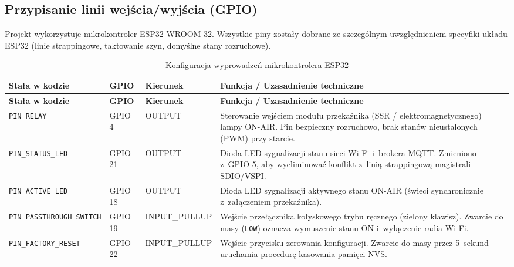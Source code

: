 \documentclass[11pt,a4paper]{article}
\begin{document}
\subsection{Przypisanie linii wejścia/wyjścia (GPIO)}
Projekt wykorzystuje mikrokontroler ESP32-WROOM-32. Wszystkie piny zostały dobrane ze szczególnym uwzględnieniem specyfiki układu ESP32 (linie strappingowe, taktowanie szyn, domyślne stany rozruchowe).

\begin{xltabular}{\textwidth}{l l l X}
\caption{Konfiguracja wyprowadzeń mikrokontrolera ESP32} \label{tab:pinout} \\
\toprule
\textbf{Stała w kodzie} & \textbf{GPIO} & \textbf{Kierunek} & \textbf{Funkcja / Uzasadnienie techniczne} \\
\midrule
\endfirsthead
\toprule
\textbf{Stała w kodzie} & \textbf{GPIO} & \textbf{Kierunek} & \textbf{Funkcja / Uzasadnienie techniczne} \\
\midrule
\endhead
\bottomrule
\endfoot
\texttt{PIN\_RELAY} & GPIO 4 & OUTPUT & Sterowanie wejściem modułu przekaźnika (SSR / elektromagnetycznego) lampy ON-AIR. Pin bezpieczny rozruchowo, brak stanów nieustalonych (PWM) przy starcie. \\
\addlinespace
\texttt{PIN\_STATUS\_LED} & GPIO 21 & OUTPUT & Dioda LED sygnalizacji stanu sieci Wi-Fi i~brokera MQTT. Zmieniono z~GPIO 5, aby wyeliminować konflikt z~linią strappingową magistrali SDIO/VSPI. \\
\addlinespace
\texttt{PIN\_ACTIVE\_LED} & GPIO 18 & OUTPUT & Dioda LED sygnalizacji aktywnego stanu ON-AIR (świeci synchronicznie z~załączeniem przekaźnika). \\
\addlinespace
\texttt{PIN\_PASSTHROUGH\_SWITCH} & GPIO 19 & INPUT\_PULLUP & Wejście przełącznika kołyskowego trybu ręcznego (zielony klawisz). Zwarcie do masy (\texttt{LOW}) oznacza wymuszenie stanu ON i~wyłączenie radia Wi-Fi. \\
\addlinespace
\texttt{PIN\_FACTORY\_RESET} & GPIO 22 & INPUT\_PULLUP & Wejście przycisku zerowania konfiguracji. Zwarcie do masy przez 5~sekund uruchamia procedurę kasowania pamięci NVS. \\
\end{xltabular}
\end{document}
